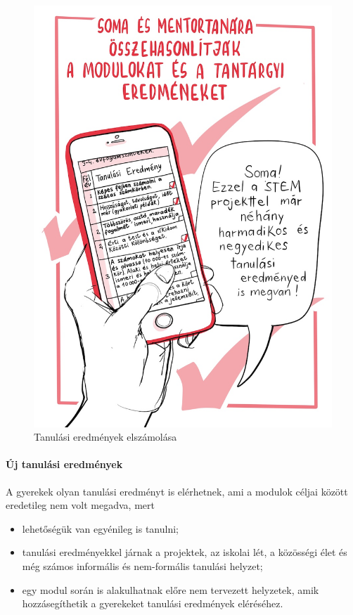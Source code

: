 \begin{figure}
\centering
\includegraphics{pics/6a_tantargyi_soma.jpg}
\caption{Tanulási eredmények elszámolása}
\end{figure}

\hypertarget{uj-tanulasi-eredmenyek}{%
\paragraph{Új tanulási eredmények}\label{uj-tanulasi-eredmenyek}}

A gyerekek olyan tanulási eredményt is elérhetnek, ami a modulok céljai
között eredetileg nem volt megadva, mert

\begin{itemize}
\tightlist
\item
  lehetőségük van egyénileg is tanulni;
\item
  tanulási eredményekkel járnak a projektek, az iskolai lét, a közösségi
  élet és még számos informális és nem-formális tanulási helyzet;
\item
  egy modul során is alakulhatnak előre nem tervezett helyzetek,\break
  amik
  hozzásegíthetik a gyerekeket tanulási eredmények eléréséhez.
\end{itemize}

